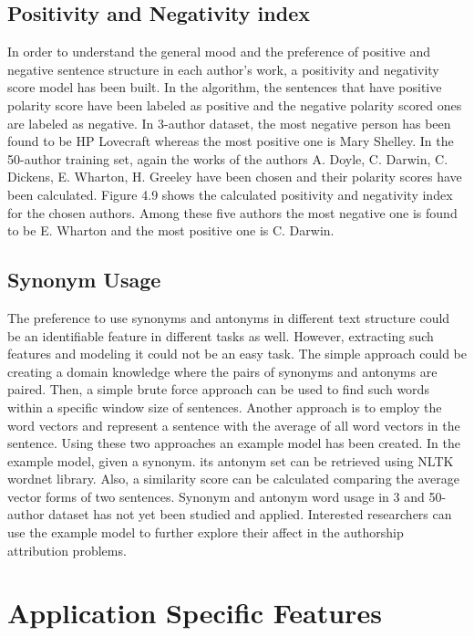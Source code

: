 \subsection{Positivity and Negativity index}
In order to understand the general mood and the preference of positive and negative sentence structure in each author’s work, a positivity and negativity score model
has been built. 
In the algorithm, the sentences that have positive polarity score
have been labeled as positive and the negative polarity scored ones are labeled as
negative. In 3-author dataset, the most negative person has been found to be HP
Lovecraft whereas the most positive one is Mary Shelley.
In the 50-author training set, again the works of the authors A. Doyle, C. Darwin,
C. Dickens, E. Wharton, H. Greeley have been chosen and their polarity scores have
been calculated. Figure 4.9 shows the calculated positivity and negativity index for
the chosen authors. Among these five authors the most negative one is found to be
E. Wharton and the most positive one is C. Darwin.

\subsection{Synonym Usage}

The preference to use synonyms and antonyms in different text structure could
be an identifiable feature in different tasks as well. However, extracting such features
and modeling it could not be an easy task. The simple approach could be creating
a domain knowledge where the pairs of synonyms and antonyms are paired. Then, a
simple brute force approach can be used to find such words within a specific window
size of sentences. Another approach is to employ the word vectors and represent
a sentence with the average of all word vectors in the sentence. Using these two
approaches an example model has been created. 
In the example model, given a synonym. its antonym set can be retrieved using NLTK wordnet library. Also, a
similarity score can be calculated comparing the average vector forms of two sentences.
Synonym and antonym word usage in 3 and 50-author dataset has not yet been studied
and applied. Interested researchers can use the example model to further explore their
affect in the authorship attribution problems.

\section{Application Specific Features}

